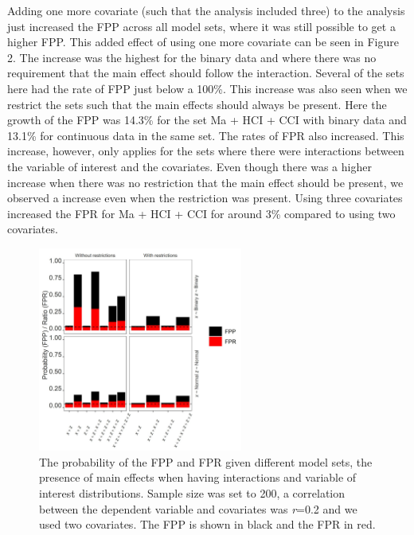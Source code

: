 Adding one more covariate (such that the analysis included three) to the analysis just increased the FPP across all model sets, where it was still possible to get a higher FPP. This added effect of using one more covariate can be seen in Figure 2. The increase was the highest for the binary data and where there was no requirement that the main effect should follow the interaction. Several of the sets here had the rate of FPP just below a 100\%. This increase was also seen when we restrict the sets such that the main effects should always be present. Here the growth of the FPP was 14.3\% for the set Ma + HCI + CCI with binary data and 13.1\% for continuous data in the same set. The rates of FPR also increased. This increase, however, only applies for the sets where there were interactions between the variable of interest and the covariates. Even though there was a higher increase when there was no restriction that the main effect should be present, we observed a increase even when the restriction was present. Using three covariates increased the FPR for Ma + HCI + CCI for around 3\% compared to using two covariates. 

\begin{figure}[t]
\includegraphics[width=0.6\textwidth]{R/Analysis/Result/Figures/Figure1A.jpeg}
\centering
\caption{The probability of the FPP and FPR given different model sets, the presence of main effects when having interactions and variable of interest distributions. Sample size was set to 200, a correlation between the dependent variable and covariates was \textit{r}=0.2 and we used two covariates. The FPP is shown in black and the FPR in red.}
\label{fig:mainfigure}
\end{figure}

